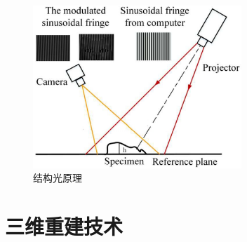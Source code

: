 \begin{figure}[h]
    \centering
    \includegraphics[width = 0.7\textwidth]{./Pictures/str_lighting.eps}
    \caption{结构光原理}
    \label{str_lighting}
\end{figure}

\section{三维重建技术}